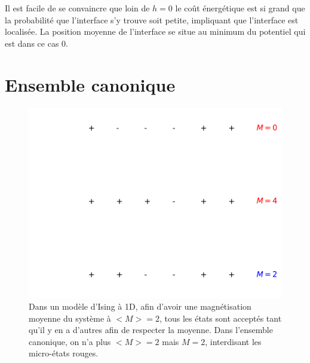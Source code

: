 Il est facile de se convaincre que loin de $h=0$ le coût énergétique est si grand que la probabilité que l'interface s'y trouve soit petite, impliquant que l'interface est localisée. La position moyenne de l'interface se situe au minimum du potentiel qui est dans ce cas $0$. 


	\section{Ensemble canonique}

\begin{figure}[h]
	\centering
	\includegraphics[scale=1]{isingtosos/figure-canonique.pdf}
	\caption{Dans un modèle d'Ising à 1D, afin d'avoir une magnétisation moyenne du système à $<M>=2$, tous les états sont acceptés tant qu'il y en a d'autres afin de respecter la moyenne. Dans l'ensemble canonique, on n'a plus $<M>=2$ mais $M=2$, interdisant les micro-états rouges.}
\end{figure}

